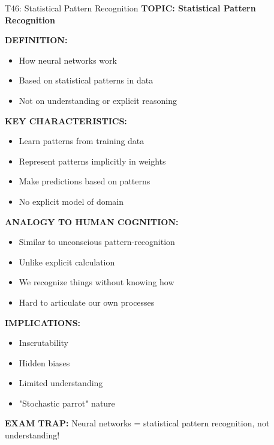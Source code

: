 \documentclass[8pt]{beamer}
\begin{document}
	\begin{frame}{T46: Statistical Pattern Recognition}
		\fontsize{6.5}{7.5}\selectfont
		\textbf{TOPIC: Statistical Pattern Recognition}
		
		\vspace{0.1cm}
		\textbf{DEFINITION:}
		\begin{itemize}
			\item How neural networks work
			\item Based on statistical patterns in data
			\item Not on understanding or explicit reasoning
		\end{itemize}
		
		\vspace{0.1cm}
		\textbf{KEY CHARACTERISTICS:}
		\begin{itemize}
			\item Learn patterns from training data
			\item Represent patterns implicitly in weights
			\item Make predictions based on patterns
			\item No explicit model of domain
		\end{itemize}
		
		\vspace{0.1cm}
		\textbf{ANALOGY TO HUMAN COGNITION:}
		\begin{itemize}
			\item Similar to unconscious pattern-recognition
			\item Unlike explicit calculation
			\item We recognize things without knowing how
			\item Hard to articulate our own processes
		\end{itemize}
		
		\vspace{0.1cm}
		\textbf{IMPLICATIONS:}
		\begin{itemize}
			\item Inscrutability
			\item Hidden biases
			\item Limited understanding
			\item "Stochastic parrot" nature
		\end{itemize}
		
		\textcolor{myred}{\textbf{EXAM TRAP:}} Neural networks = \textcolor{myblue}{statistical pattern recognition}, not understanding!
	\end{frame}
	
\end{document}
